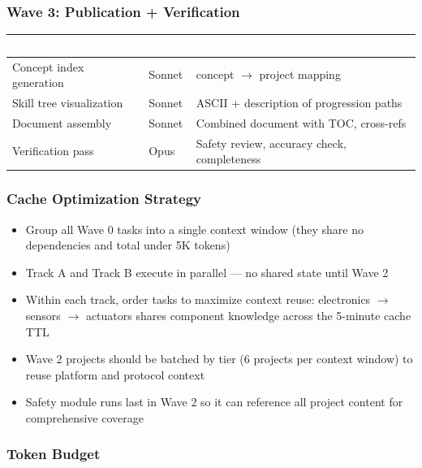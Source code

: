 \documentclass[11pt,letterpaper]{article}
\newcommand{\tableheader}[1]{\textbf{\sffamily\textcolor{white}{#1}}}
\begin{document}
\subsubsection{Wave 3: Publication + Verification}

\begin{center}
\begin{tabularx}{\textwidth}{L{3.5cm}C{1.5cm}X}
\toprule
{}
\tableheader{Task} & \tableheader{Model} & \tableheader{Output} \\
\midrule
Concept index generation & Sonnet & concept $\rightarrow$ project mapping \\
Skill tree visualization & Sonnet & ASCII + description of progression paths \\
Document assembly & Sonnet & Combined document with TOC, cross-refs \\
Verification pass & Opus & Safety review, accuracy check, completeness \\
\bottomrule
\end{tabularx}
\end{center}

\subsubsection{Cache Optimization Strategy}

\begin{itemize}[leftmargin=2em]
  \item Group all Wave 0 tasks into a single context window (they share no dependencies and total under 5K tokens)
  \item Track A and Track B execute in parallel --- no shared state until Wave 2
  \item Within each track, order tasks to maximize context reuse: electronics $\rightarrow$ sensors $\rightarrow$ actuators shares component knowledge across the 5-minute cache TTL
  \item Wave 2 projects should be batched by tier (6 projects per context window) to reuse platform and protocol context
  \item Safety module runs last in Wave 2 so it can reference all project content for comprehensive coverage
\end{itemize}

\subsubsection{Token Budget}
\end{document}
